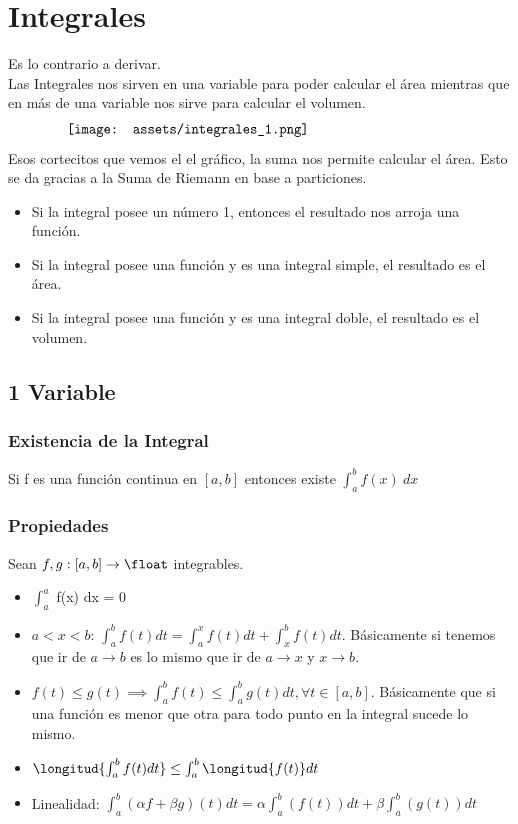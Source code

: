 \documentclass[10pt,a4paper]{article}
\begin{document}
\section*{Integrales}
Es lo contrario a derivar. \\
Las Integrales nos sirven en una variable para poder calcular el área mientras que en más de una variable nos sirve para calcular el volumen. 
\[\begin{minipage}[b]{0.8\textwidth}
    \texttt{[image: assets/integrales\_1.png]}
\end{minipage}\]
Esos cortecitos que vemos el el gráfico, la suma nos permite calcular el área. Esto se da gracias a la Suma de Riemann en base a particiones. 
\begin{itemize}
    \item Si la integral posee un número 1, entonces el resultado nos arroja una función.
    \item Si la integral posee una función y es una integral simple, el resultado es el área.
    \item Si la integral posee una función y es una integral doble, el resultado es el volumen.
\end{itemize}
\subsection*{1 Variable}
\subsubsection*{Existencia de la Integral}
Si f es una función continua en $[a,b]$ entonces existe $\int^{b}_{a} f(x) \ dx$
\subsubsection*{Propiedades}
Sean $f,g:[a,b] \rightarrow \float$ integrables. 
\begin{itemize}
    \item $\int^{a}_{a}$ f(x) dx = 0
    \item $a < x < b$: $\int^{b}_{a}f(t) dt = \int^{x}_{a}f(t) dt + \int^{b}_{x}f(t) dt$. Básicamente si tenemos que ir de $a \rightarrow b$ es lo mismo que ir de $a \rightarrow x$ y $x \rightarrow b$.
    \item $f(t) \le g(t) \implies \int^{b}_{a}f(t) \le \int^{b}_{a}g(t) dt, \forall t \in [a,b]$. Básicamente que si una función es menor que otra para todo punto en la integral sucede lo mismo.
    \item $\longitud{\int^{b}_{a}f(t) dt} \le \int^{b}_{a}\longitud{f(t)} dt$
    \item Linealidad: $\int^{b}_{a}(\alpha f + \beta g)(t) dt = \alpha \int^{b}_{a}(f(t)) dt + \beta \int^{b}_{a}(g(t)) dt$
\end{itemize}
\end{document}
